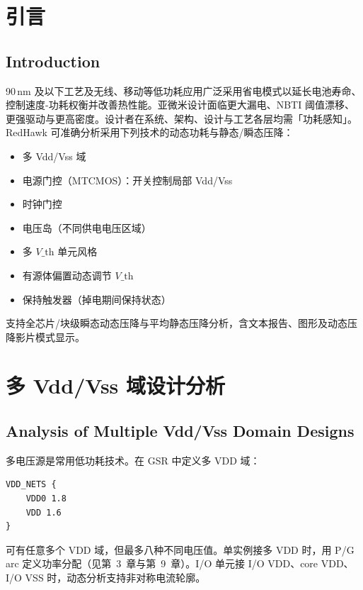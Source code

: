 ﻿%
\label{chap:lp}

\section{引言}
\subsection*{Introduction}

90\,nm 及以下工艺及无线、移动等低功耗应用广泛采用省电模式以延长电池寿命、控制速度-功耗权衡并改善热性能。亚微米设计面临更大漏电、NBTI 阈值漂移、更强驱动与更高密度。设计者在系统、架构、设计与工艺各层均需「功耗感知」。RedHawk 可准确分析采用下列技术的动态功耗与静态/瞬态压降：

\begin{itemize}
  \item 多 Vdd/Vss 域
  \item 电源门控（MTCMOS）：开关控制局部 Vdd/Vss
  \item 时钟门控
  \item 电压岛（不同供电电压区域）
  \item 多 $V\_{\mathrm{th}}$ 单元风格
  \item 有源体偏置动态调节 $V\_{\mathrm{th}}$
  \item 保持触发器（掉电期间保持状态）
\end{itemize}

支持全芯片/块级瞬态动态压降与平均静态压降分析，含文本报告、图形及动态压降影片模式显示。

\section{多 Vdd/Vss 域设计分析}
\subsection*{Analysis of Multiple Vdd/Vss Domain Designs}

多电压源是常用低功耗技术。在 GSR 中定义多 VDD 域：
\begin{lstlisting}
VDD_NETS {
    VDD0 1.8
    VDD 1.6
}
\end{lstlisting}

可有任意多个 VDD 域，但最多八种不同电压值。单实例接多 VDD 时，用 P/G arc 定义功率分配（见第~3~章与第~9~章）。I/O 单元接 I/O VDD、core VDD、I/O VSS 时，动态分析支持非对称电流轮廓。

